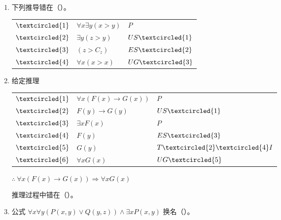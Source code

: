 \begin{enumerate}
	\item 下列推导错在（\quad）。
	
	\begin{tabular}{lll}
		\(\textcircled{1}\) & \(\forall x\exists y(x>y)\) & \(P\) \\
		\(\textcircled{2}\) & \(\exists y(z>y)\) & \(US\textcircled{1}\) \\
		\(\textcircled{3}\) & \((z>C_z)\) & \(ES\textcircled{2}\) \\
		\(\textcircled{4}\) & \(\forall x(x>x)\) & \(UG\textcircled{3}\)
	\end{tabular}
	
	\item 给定推理
	
	\begin{tabular}{lll}
		\(\textcircled{1}\) & \(\forall x(F(x)\to G(x))\) & \(P\) \\
		\(\textcircled{2}\) & \(F(y)\to G(y)\) & \(US\textcircled{1}\) \\
		\(\textcircled{3}\) & \(\exists xF(x)\) & \(P\) \\
		\(\textcircled{4}\) & \(F(y)\) & \(ES\textcircled{3}\) \\
		\(\textcircled{5}\) & \(G(y)\) & \(T\textcircled{2}\textcircled{4}I\) \\
		\(\textcircled{6}\) & \(\forall xG(x)\) & \(UG\textcircled{5}\)
	\end{tabular}
	
	\(\therefore\ \forall x(F(x)\to G(x))\Rightarrow \forall xG(x)\)
	
	推理过程中错在（\quad）。
	
	\item 公式 \(\forall x\forall y(P(x,y)\vee Q(y,z))\land \exists xP(x,y)\) 换名（\quad）。
	

\end{enumerate}
